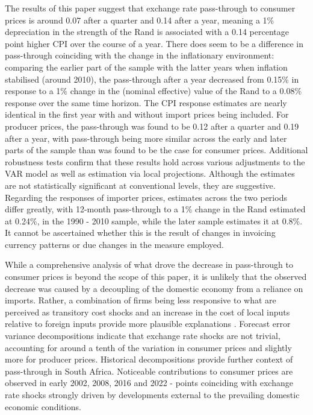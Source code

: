 \documentclass[12pt]{article}
\begin{document}
 The results of this paper suggest that exchange rate pass-through to consumer prices is around 0.07 after a quarter and 0.14 after a year, meaning a 1\% depreciation in the strength of the Rand is associated with a 0.14 percentage point higher CPI over the course of a year. There does seem to be a difference in pass-through coinciding with the change in the inflationary environment: comparing the earlier part of the sample with the latter years when inflation stabilised (around 2010), the pass-through after a year decreased from 0.15\% in response to a 1\% change in the (nominal effective) value of the Rand to a 0.08\% response over the same time horizon. The CPI response estimates are nearly identical in the first year with and without import prices being included. For producer prices, the pass-through was found to be 0.12 after a quarter and 0.19 after a year, with pass-through being more similar across the early and later parts of the sample than was found to be the case for consumer prices. Additional robustness tests confirm that these results hold across various adjustments to the VAR model as well as estimation via local projections. Although the estimates are not statistically significant at conventional levels, they are suggestive. Regarding the responses of importer prices, estimates across the two periods differ greatly, with 12-month pass-through to a 1\% change in the Rand estimated at 0.24\%, in the 1990 - 2010 sample, while the later sample estimates it at 0.8\%. It cannot be ascertained whether this is the result of changes in invoicing currency patterns or due changes in the measure employed.
 
  While a comprehensive analysis of what drove the decrease in pass-through to consumer prices is beyond the scope of this paper, it is unlikely that the observed decrease was caused by a decoupling of the domestic economy from a reliance on imports. Rather, a combination of firms being less responsive to what are perceived as transitory cost shocks and an increase in the cost of local inputs relative to foreign inputs provide more plausible explanations \parencite{taylor2000low, burstein2003distribution}. Forecast error variance decompositions indicate that exchange rate shocks are not trivial, accounting for around a tenth of the variation in consumer prices and slightly more for producer prices. Historical decompositions provide further context of pass-through in South Africa. Noticeable contributions to consumer prices are observed in early 2002, 2008, 2016 and 2022 - points coinciding with exchange rate shocks strongly driven by developments external to the prevailing domestic economic conditions. 
 
\end{document}
